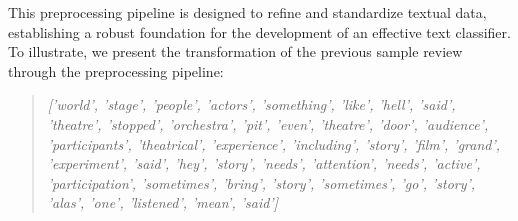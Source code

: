 This preprocessing pipeline is designed to refine and standardize textual data, establishing a robust foundation for the development of an effective text classifier. To illustrate, we present the transformation of the previous sample review through the preprocessing pipeline:


\begin{quote}
    \textit{['world', 'stage', 'people', 'actors', 'something', 'like', 'hell', 'said', 'theatre', 'stopped', 'orchestra', 'pit', 'even', 'theatre', 'door', 'audience', 'participants', 'theatrical', 'experience', 'including', 'story', 'film', 'grand', 'experiment', 'said', 'hey', 'story', 'needs', 'attention', 'needs', 'active', 'participation', 'sometimes', 'bring', 'story', 'sometimes', 'go', 'story', 'alas', 'one', 'listened', 'mean', 'said']
    }
\end{quote}
